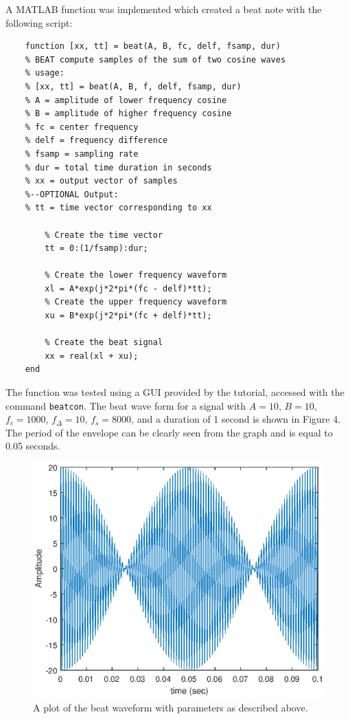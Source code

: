 \documentclass{article}
\begin{document}
A MATLAB function was implemented which created a beat note with the following script:
\begin{lstlisting}
	function [xx, tt] = beat(A, B, fc, delf, fsamp, dur)
	% BEAT compute samples of the sum of two cosine waves
	% usage:
	% [xx, tt] = beat(A, B, f, delf, fsamp, dur)
	% A = amplitude of lower frequency cosine
	% B = amplitude of higher frequency cosine
	% fc = center frequency
	% delf = frequency difference
	% fsamp = sampling rate
	% dur = total time duration in seconds
	% xx = output vector of samples
	%--OPTIONAL Output:
	% tt = time vector corresponding to xx
	    
	    % Create the time vector
	    tt = 0:(1/fsamp):dur;
	    
	    % Create the lower frequency waveform
	    xl = A*exp(j*2*pi*(fc - delf)*tt);
	    % Create the upper frequency waveform
	    xu = B*exp(j*2*pi*(fc + delf)*tt);
	    
	    % Create the beat signal
	    xx = real(xl + xu);
	end
\end{lstlisting}

The function was tested using a GUI provided by the tutorial, accessed with the command \verb|beatcon|. The beat wave form for a signal with $A = 10$, $B = 10$, $f_c = 1000$, $f_{\Delta} = 10$, $f_s = 8000$, and a duration of 1 second is shown in Figure 4. The period of the envelope can be clearly seen from the graph and is equal to 0.05 seconds.

\begin{figure}
	\centering
	\includegraphics[scale=0.8]{fig4.eps}
	\caption{A plot of the beat waveform with parameters as described above.}
\end{figure}
\end{document}
